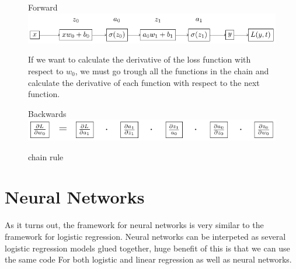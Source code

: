 \documentclass[twoside,11pt]{report}
\begin{document}
    \begin{figure}[!h]
        \begin{center}
            Forward\\
            \includegraphics[width=\textwidth]{tikzfigures/forward.pdf}\\
        \end{center}
        If we want to calculate the derivative of the loss function with respect to $w_0$,
        we must go trough all the functions in the chain and calculate the derivative of 
        each function with respect to the next function.
        \begin{center}
            Backwards\\
            \hspace{1cm}
            \includegraphics[width=\textwidth]{tikzfigures/backwards.pdf}
        \end{center}
        \caption{chain rule}\label{fig:chainrule}
    \end{figure}




\section{Neural Networks}
\label{sec:NN}

    As it turns out, the framework for neural networks is very similar to the framework for logistic regression.
    Neural networks can be interpeted as several logistic regression models glued together, 
    huge benefit of this is that we can use the same code
    For both logistic and linear regression as well as neural networks.
\end{document}

